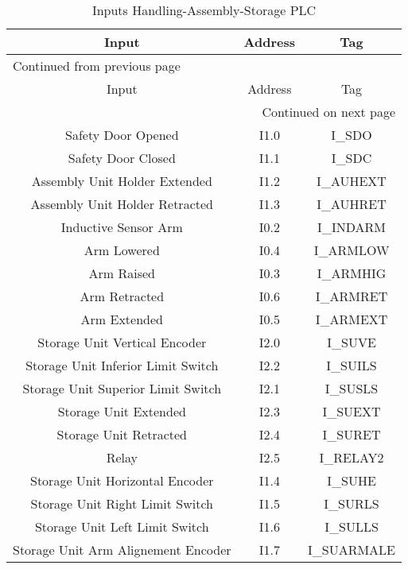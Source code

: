 \begin{longtable}{c|c|c}
\caption{Inputs Handling-Assembly-Storage PLC} \label{tab:plcHandlingInput}
\\
Input & Address & Tag\\
\hline
\endfirsthead
\multicolumn{3}{l}{Continued from previous page} \\
\hline

Input & Address & Tag \\

\hline
\endhead
\hline\multicolumn{3}{r}{Continued on next page} \\
\endfoot
\endlastfoot
\hline
Safety Door Opened & I1.0 & I\_SDO      \\
Safety Door Closed & I1.1 & I\_SDC      \\
Assembly Unit Holder Extended & I1.2 & I\_AUHEXT   \\
Assembly Unit Holder Retracted & I1.3 & I\_AUHRET   \\
Inductive Sensor Arm & I0.2 & I\_INDARM   \\
Arm Lowered & I0.4 & I\_ARMLOW   \\
Arm Raised & I0.3 & I\_ARMHIG   \\
Arm Retracted & I0.6 & I\_ARMRET   \\
Arm Extended & I0.5 & I\_ARMEXT   \\
Storage Unit Vertical Encoder & I2.0 & I\_SUVE     \\
Storage Unit Inferior Limit Switch & I2.2 & I\_SUILS    \\
Storage Unit Superior Limit Switch & I2.1 & I\_SUSLS    \\
Storage Unit Extended & I2.3 & I\_SUEXT    \\
Storage Unit Retracted & I2.4 & I\_SURET    \\
Relay & I2.5 & I\_RELAY2   \\
Storage Unit Horizontal Encoder & I1.4 & I\_SUHE     \\
Storage Unit Right Limit Switch & I1.5 & I\_SURLS    \\
Storage Unit Left Limit Switch & I1.6 & I\_SULLS    \\
Storage Unit Arm Alignement Encoder & I1.7 & I\_SUARMALE \\
\end{longtable}

